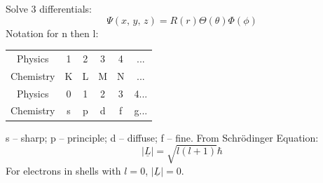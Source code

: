 \documentclass[a4paper, 11pt, normalem]{report}
\begin{document}
Solve 3 differentials:
\begin{equation}
    \Psi(x,\,y,\,z) = R(r)\Theta(\theta)\Phi(\phi)
\end{equation}
Notation for n then l:
\begin{table}[H]
    \centering
    \begin{tabular}{|c|ccccc|}
        \hline
        Physics   & 1 & 2 & 3 & 4 & ...   \\
        Chemistry & K & L & M & N & ...   \\
        \hline\hline
        Physics   & 0 & 1 & 2 & 3 & 4... \\
        Chemistry & s & p & d & f & g... \\
        \hline
    \end{tabular}
\end{table}
s -- sharp; p -- principle; d -- diffuse; f -- fine.
From Schr\"{o}dinger Equation:
\begin{equation}
    |\underline{L}| = \sqrt{l(l + 1)}\hbar
\end{equation}
For electrons in shells with $l = 0$, $|\underline{L}| = 0$.
\end{document}
